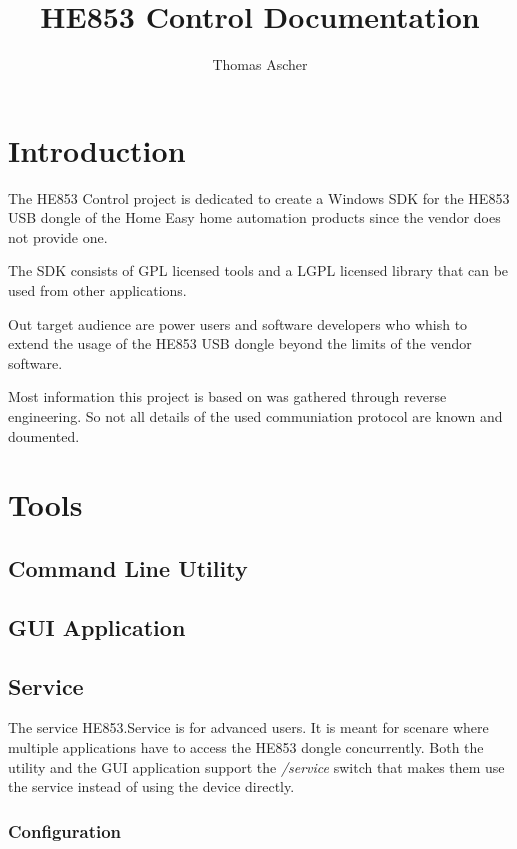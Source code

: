 \documentclass[
a4paper,
oneside,
halfparskip*,
normalheadings,
]
{scrbook}
\begin{document}
\title{HE853 Control Documentation}
\author{Thomas Ascher}
\maketitle
\tableofcontents
\frontmatter
\mainmatter

\chapter{Introduction}

The HE853 Control project is dedicated to create a Windows SDK for the HE853 USB
dongle of the Home Easy home automation products since the vendor does not provide
one.

The SDK consists of GPL licensed tools and a LGPL licensed library that can be
used from other applications.

Out target audience are power users and software developers who whish to extend the
usage of the HE853 USB dongle beyond the limits of the vendor software.

Most information this project is based on was gathered through reverse engineering.
So not all details of the used communiation protocol are known and doumented.

\chapter{Tools}

\section{Command Line Utility}

\section{GUI Application}

\section{Service}

The service HE853.Service is for advanced users. It is meant for scenare where multiple
applications have to access the HE853 dongle concurrently. Both the utility and the
GUI application support the \textit{/service} switch that makes them use the service
instead of using the device directly.

\subsection{Configuration}
\end{document}
